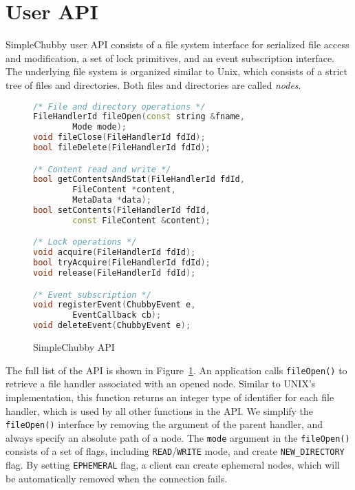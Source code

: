\section{User API}
\label{section:api}

SimpleChubby user API consists of
a file system interface for serialized file access and modification,
a set of lock primitives,
and an event subscription interface.
The underlying file system is organized similar to Unix,
which consists of a strict tree of files and directories.
Both files and directories are called \emph{nodes}.

\begin{figure}
\centering
\begin{lstlisting}[language=C++,
    basicstyle=\footnotesize\ttfamily,
    commentstyle=\bfseries,
    deletekeywords={delete},
    morekeywords={FileHandlerId, string, Mode, FileContent, MetaData, ChubbyEvent, EventCallback}]
/* File and directory operations */
FileHandlerId fileOpen(const string &fname,
        Mode mode);
void fileClose(FileHandlerId fdId);
bool fileDelete(FileHandlerId fdId);

/* Content read and write */
bool getContentsAndStat(FileHandlerId fdId,
        FileContent *content,
        MetaData *data);
bool setContents(FileHandlerId fdId,
        const FileContent &content);

/* Lock operations */
void acquire(FileHandlerId fdId);
bool tryAcquire(FileHandlerId fdId);
void release(FileHandlerId fdId);

/* Event subscription */
void registerEvent(ChubbyEvent e,
        EventCallback cb);
void deleteEvent(ChubbyEvent e);
\end{lstlisting}
\caption{SimpleChubby API}
\label{fig:api}
\end{figure}

The full list of the API is shown in Figure~\ref{fig:api}.
An application calls \texttt{fileOpen()} to retrieve a file handler
associated with an opened node. Similar to UNIX's implementation,
this function returns an integer type of identifier for each file handler,
which is used by all other functions in the API.
We simplify the \texttt{fileOpen()} interface by removing the argument of
the parent handler, and always specify an absolute path of a node.
The \texttt{mode} argument in the \texttt{fileOpen()} consists of a set of flags,
including \texttt{READ}/\texttt{WRITE} mode, and create \texttt{NEW\_DIRECTORY} flag.
By setting \texttt{EPHEMERAL} flag, a client can create ephemeral nodes,
which will be automatically removed when the connection fails.

